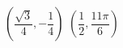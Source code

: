{ $\left( \dfrac{\sqrt{3}}{4}, -\dfrac{1}{4} \right)$}
{ $\left( \dfrac{1}{2}, \dfrac{11\pi}{6} \right)$}
